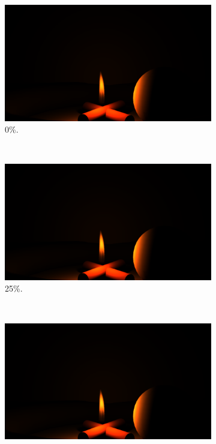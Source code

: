 \begin{figure}[htpb]
        \centering
        \begin{subfigure}[t]{0.2\textwidth}
                \includegraphics[width=\textwidth, trim={14.5cm 2.5cm 16.5cm 10.5cm}, clip]{img/result_propane}
                \caption{0\%.}
        \end{subfigure}%
        ~ 
        \begin{subfigure}[t]{0.2\textwidth}
                \includegraphics[width=\textwidth, trim={14.5cm 2.5cm 16.5cm 10.5cm}, clip]{img/result_propane_0_25_v}
                \caption{25\%.}
        \end{subfigure}%
        ~ 
        \begin{subfigure}[t]{0.2\textwidth}
                \includegraphics[width=\textwidth, trim={14.5cm 2.5cm 16.5cm 10.5cm}, clip]{img/result_propane_0_5_v}

\end{subfigure}
\end{figure}
